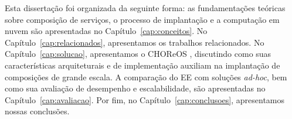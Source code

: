 \newpage

Esta dissertação foi organizada da seguinte forma: as fundamentações teóricas sobre composição de serviços, o processo de implantação e a computação em nuvem são apresentadas no Capítulo~\ref{cap:conceitos}. No Capítulo~\ref{cap:relacionados}, apresentamos os trabalhos relacionados. No Capítulo~\ref{cap:solucao}, apresentamos o CHOReOS \ee, discutindo como suas características arquiteturais e de implementação auxiliam na implantação de composições de grande escala. A comparação do EE com soluções \emph{ad-hoc}, bem como sua avaliação de desempenho e escalabilidade, são apresentadas no Capítulo~\ref{cap:avaliacao}. Por fim, no Capítulo~\ref{cap:conclusoes}, apresentamos nossas conclusões.




